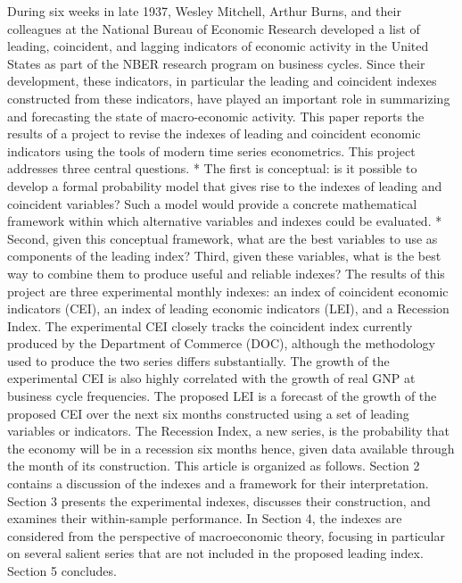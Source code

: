 \documentclass[]{book}
\begin{document}
During six weeks in late 1937, Wesley Mitchell, Arthur Burns, and their colleagues at the National Bureau of Economic Research developed a list of leading, coincident, and lagging indicators of economic activity in the United States as part of the NBER research program on business cycles. Since their development, these indicators, in particular the leading and coincident indexes constructed from these indicators, have played an important role in summarizing and forecasting the state of macro-economic activity.
This paper reports the results of a project to revise the indexes of leading and coincident economic indicators using the tools of modern time series econometrics. This project addresses three central questions.
* The first is conceptual: is it possible to develop a formal probability model that gives rise to the indexes of leading and coincident variables? Such a model would provide a concrete mathematical framework within which alternative variables and indexes could be evaluated.
* Second, given this conceptual framework, what are the best variables to use as components of the leading index? Third, given these variables, what is the best way to combine them to produce useful and reliable indexes?
The results of this project are three experimental monthly indexes: an index of coincident economic indicators (CEI), an index of leading economic indicators (LEI), and a Recession Index. The experimental CEI closely tracks the coincident index currently produced by the Department of Commerce (DOC), although the methodology used to produce the two series differs substantially. The growth of the experimental CEI is also highly correlated with the growth of real GNP at business cycle frequencies. The proposed LEI is a forecast of the growth of the proposed CEI over the next six months constructed using a set of leading variables or indicators. The Recession Index, a new series, is the probability that the economy will be in a recession six months hence, given data available through the month of its construction.
This article is organized as follows. Section 2 contains a discussion of the indexes and a framework for their interpretation. Section 3 presents the experimental indexes, discusses their construction, and examines their within-sample performance. In Section 4, the indexes are considered from the perspective of macroeconomic theory, focusing in particular on several salient series that are not included in the proposed leading index. Section 5 concludes.

\citep{stock1989new}
\end{document}

